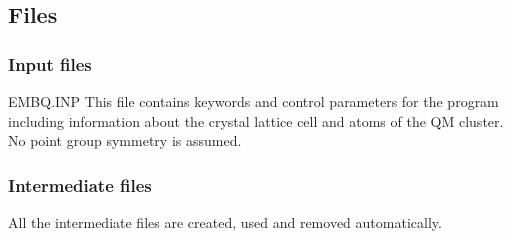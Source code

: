 \subsection{Files}
\label{UG:sec:embq_files}
\subsubsection{Input files}
\begin{filelist}
\item[EMBQ.INP]
This file contains keywords and control parameters for the  program including  information about the crystal lattice cell and atoms of the QM cluster. No point group symmetry is assumed.
\end{filelist}

\subsubsection{Intermediate files}
All the intermediate files are created, used and removed
automatically.

